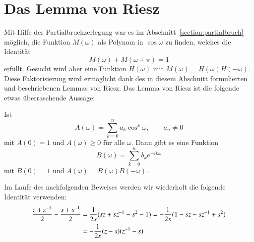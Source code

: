 %
%
%

%
%
\section{Das Lemma von Riesz\label{section:riesz}}
Mit Hilfe der Partialbruchzerlegung war es im
Abschnitt~\ref{section:partialbruch}
möglich, die Funktion $M(\omega)$ als Polynom in $\cos\omega$ zu finden,
welches die Identität
\[
M(\omega) + M(\omega + \pi) = 1
\]
erfüllt.
Gesucht wird aber eine Funktion $H(\omega)$ mit
$M(\omega)=H(\omega)H(-\omega)$.
Diese Faktorisierung wird ermöglicht dank des in diesem Abschnitt
formulierten und beschriebenen Lemmas von Riesz.
Das Lemma von Riesz ist die folgende etwas überraschende Aussage:

\begin{lemma}[Riesz]
Ist
\[
A(\omega)
=
\sum_{k=0}^n
a_k \cos^k \omega,
\qquad
a_n\ne 0
\]
mit $A(0)=1$ und $A(\omega)\ge 0$ für alle $\omega$.
Dann gibt es eine Funktion
\[
B(\omega)
=
\sum_{k=0}^n b_ke^{-ik\omega}
\]
mit $B(0)=1$ und $A(\omega)=B(\omega)B(-\omega)$.
\end{lemma}

Im Laufe des nachfolgenden Beweises werden wir wiederholt die folgende
Identität verwenden:
\begin{align}
\frac{z+z^{-1}}2-\frac{s+s^{-1}}2
&=
\frac1{2s}(sz+sz^{-1}-s^2-1)
=
-
\frac1{2s}(1-sz-sz^{-1}+s^2)
\notag
\\
&=
-
\frac1{2s}(z-s)(z^{-1}-s)
\label{buch:kompakt:cosh}
\end{align}

